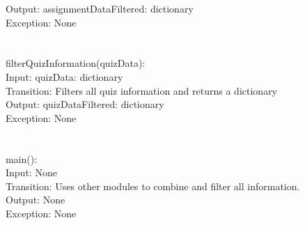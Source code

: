 \documentclass[12pt, titlepage]{article}
\begin{document}
    Output: assignmentDataFiltered: dictionary\\
    
    Exception: None\\
\\
\\

filterQuizInformation(quizData):\\

    Input: quizData: dictionary\\

    Transition: Filters all quiz information and returns a dictionary\\

    Output: quizDataFiltered: dictionary\\

    Exception: None\\
\\
\\

main():\\

    Input: None\\

    Transition: Uses other modules to combine and filter all information.\\

    Output: None\\

    Exception: None\\
\\
\\
\end{document}
